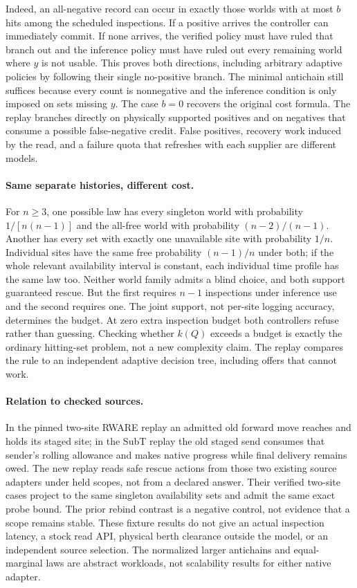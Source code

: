 \documentclass[11pt]{article}
\begin{document}
Indeed, an all-negative record can occur in exactly those worlds with at most $b$ hits among the scheduled inspections. If a positive arrives the controller can immediately commit. If none arrives, the verified policy must have ruled that branch out and the inference policy must have ruled out every remaining world where $y$ is not usable. This proves both directions, including arbitrary adaptive policies by following their single no-positive branch. The minimal antichain still suffices because every count is nonnegative and the inference condition is only imposed on sets missing $y$. The case $b=0$ recovers the original cost formula. The replay branches directly on physically supported positives and on negatives that consume a possible false-negative credit. False positives, recovery work induced by the read, and a failure quota that refreshes with each supplier are different models.

\paragraph{Same separate histories, different cost.}
For $n\ge3$, one possible law has every singleton world with probability $1/[n(n-1)]$ and the all-free world with probability $(n-2)/(n-1)$. Another has every set with exactly one unavailable site with probability $1/n$. Individual sites have the same free probability $(n-1)/n$ under both; if the whole relevant availability interval is constant, each individual time profile has the same law too. Neither world family admits a blind choice, and both support guaranteed rescue. But the first requires $n-1$ inspections under inference use and the second requires one. The joint support, not per-site logging accuracy, determines the budget. At zero extra inspection budget both controllers refuse rather than guessing. Checking whether $k(Q)$ exceeds a budget is exactly the ordinary hitting-set problem, not a new complexity claim. The replay compares the rule to an independent adaptive decision tree, including offers that cannot work.

\paragraph{Relation to checked sources.}
In the pinned two-site RWARE replay an admitted old forward move reaches and holds its staged site; in the SubT replay the old staged send consumes that sender's rolling allowance and makes native progress while final delivery remains owed. The new replay reads safe rescue actions from those two existing source adapters under held scopes, not from a declared answer. Their verified two-site cases project to the same singleton availability sets and admit the same exact probe bound. The prior rebind contrast is a negative control, not evidence that a scope remains stable. These fixture results do not give an actual inspection latency, a stock read API, physical berth clearance outside the model, or an independent source selection. The normalized larger antichains and equal-marginal laws are abstract workloads, not scalability results for either native adapter.
\end{document}
